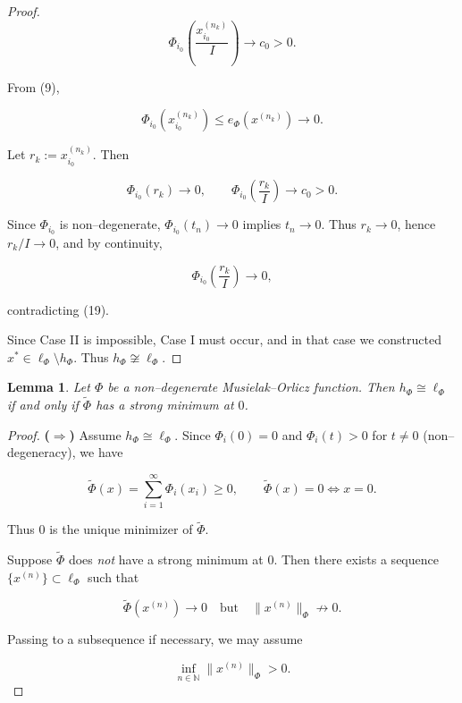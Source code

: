 \documentclass[12pt]{article}
\theoremstyle{thmstyleone}%
\newtheorem{lemma}[theorem]{Lemma}
\theoremstyle{thmstyletwo}%
\theoremstyle{thmstylethree}%
\begin{document}
{\begin{proof}
{\[
\Phi_{i_0}\!\left(\frac{x^{(n_k)}_{i_0}}{I}\right)
\to c_0 > 0.
\tag{16}
\]



From (9),


\[
\Phi_{i_0}\!\left(x^{(n_k)}_{i_0}\right)
\le e_\Phi(x^{(n_k)}) \to 0.
\tag{18}
\]



Let $r_k := x^{(n_k)}_{i_0}$.  
Then


\[
\Phi_{i_0}(r_k)\to 0,
\qquad
\Phi_{i_0}\!\left(\frac{r_k}{I}\right)\to c_0>0.
\tag{19}
\]



Since $\Phi_{i_0}$ is non--degenerate,  
$\Phi_{i_0}(t_n)\to 0$ implies $t_n\to 0$.  
Thus $r_k\to 0$, hence $r_k/I\to 0$, and by continuity,


\[
\Phi_{i_0}\!\left(\frac{r_k}{I}\right)\to 0,
\]


contradicting (19).

\bigskip
\noindent
Since Case II is impossible, Case I must occur, and in that case we constructed
$x^\ast\in \ell_\Phi\setminus h_\Phi$.  
Thus $h_\Phi\not\cong \ell_\Phi$.}
\end{proof}


{%
\begin{lemma}\label{lemma:9}
Let $\Phi$ be a non--degenerate Musielak--Orlicz function.  
Then $h_\Phi \cong \ell_\Phi$ if and only if $\widetilde{\Phi}$ has a strong minimum at $0$.
\end{lemma}

\begin{proof}
\textbf{($\Rightarrow$)}  
Assume $h_\Phi \cong \ell_\Phi$.  
Since $\Phi_i(0)=0$ and $\Phi_i(t)>0$ for $t\neq 0$ (non--degeneracy), we have


\[
\widetilde{\Phi}(x)=\sum_{i=1}^\infty \Phi_i(x_i)\ge 0,
\qquad 
\widetilde{\Phi}(x)=0 \iff x=0.
\]


Thus $0$ is the unique minimizer of $\widetilde{\Phi}$.

Suppose $\widetilde{\Phi}$ does \emph{not} have a strong minimum at $0$.  
Then there exists a sequence $\{x^{(n)}\}\subset \ell_\Phi$ such that


\[
\widetilde{\Phi}(x^{(n)})\to 0
\quad\text{but}\quad
\|x^{(n)}\|_\Phi \not\to 0.
\]

Passing to a subsequence if necessary, we may assume

\[
\inf_{n\in\mathbb N}\|x^{(n)}\|_\Phi > 0.
\]


\end{proof}}}
\end{document}
